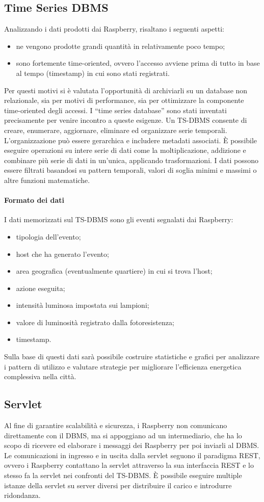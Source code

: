 \subsection{Time Series DBMS}
Analizzando i dati prodotti dai Raspberry, risaltano i seguenti aspetti:
\begin{itemize}
 \item ne vengono prodotte grandi quantità in relativamente poco tempo;
 \item sono fortemente time-oriented, ovvero l'accesso avviene prima di tutto in base al tempo (timestamp) in cui sono stati registrati.
\end{itemize}
Per questi motivi si è valutata l'opportunità di archiviarli su un database non relazionale, sia per motivi di performance, sia per ottimizzare la componente time-oriented degli accessi. I ``time series database'' sono stati inventati precisamente per venire incontro a queste esigenze.
Un TS-DBMS consente di creare, enumerare, aggiornare, eliminare ed organizzare serie temporali. L'organizzazione può essere gerarchica e includere metadati associati. È possibile eseguire operazioni su intere serie di dati come la moltiplicazione, addizione e combinare più serie di dati in un'unica, applicando trasformazioni. I dati possono essere filtrati basandosi su pattern temporali, valori di soglia minimi e massimi o altre funzioni matematiche.
\paragraph{Formato dei dati}
I dati memorizzati sul TS-DBMS sono gli eventi segnalati dai Raspberry:
\begin{itemize}
 \item tipologia dell'evento;
 \item host che ha generato l'evento;
 \item area geografica (eventualmente quartiere) in cui si trova l'host;
 \item azione eseguita;
 \item intensità luminosa impostata sui lampioni;
 \item valore di luminosità registrato dalla fotoresistenza;
 \item timestamp.
\end{itemize}
Sulla base di questi dati sarà possibile costruire statistiche e grafici per analizzare i pattern di utilizzo e valutare strategie per migliorare l'efficienza energetica complessiva nella città.

\subsection{Servlet}
Al fine di garantire scalabilità e sicurezza, i Raspberry non comunicano direttamente con il DBMS, ma si appoggiano ad un intermediario, che ha lo scopo di ricevere ed elaborare i messaggi dei Raspberry per poi inviarli al DBMS. Le comunicazioni in ingresso e in uscita dalla servlet seguono il paradigma REST, ovvero i Raspberry contattano la servlet attraverso la sua interfaccia REST e lo stesso fa la servlet nei confronti del TS-DBMS. È possibile eseguire multiple istanze della servlet su server diversi per distribuire il carico e introdurre ridondanza.
